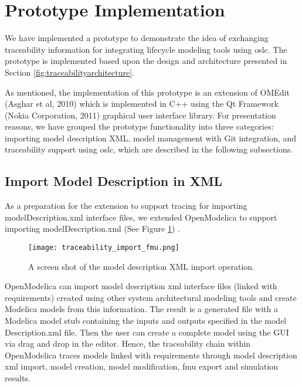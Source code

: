 \section{Prototype Implementation}
\label{sec:tracaebilityprototype}

We have implemented a prototype to demonstrate the idea of exchanging traceability information for
integrating lifecycle modeling tools using \acrshort{oslc}. The prototype is implemented based upon the design and
architecture presented in Section \ref{fig:traceabilityarchitecture}.

As mentioned, the implementation of this prototype is an extension of OMEdit (Asghar et al, 2010) which
is implemented in C++ using the Qt Framework (Nokia Corporation, 2011) graphical user interface library. For
presentation reasons, we have grouped the prototype functionality into three categories: importing model
description XML, model management with Git integration, and traceability support using \acrshort{oslc}, 
which are described in the following subsections.


\subsection{Import Model Description in XML}
\label{ssec:tracaebilityimprtxml}

As a preparation for the extension to support tracing for importing modelDescription.xml interface files, we 
extended OpenModelica to support importing modelDescription.xml (See Figure \ref{fig:traceabilityimportfmu}) . 

\begin{figure}
	\texttt{[image: traceability\_import\_fmu.png]}
	\caption{A screen shot of the model description XML import operation.}
	\label{fig:traceabilityimportfmu}
\end{figure}

OpenModelica can import model description \acrshort{xml} interface files (linked with requirements) created using
other system architectural modeling tools and create  Modelica models from this information. The result is a
generated file with a Modelica model stub containing the inputs and outputs specified in the model
Description.xml file. Then the user can create a complete model using the GUI via drag and drop in the
editor. Hence, the traceability chain within OpenModelica traces models linked with requirements
through model description \acrshort{xml} import, model creation, model modification, \acrshort{fmu} export and simulation results.

